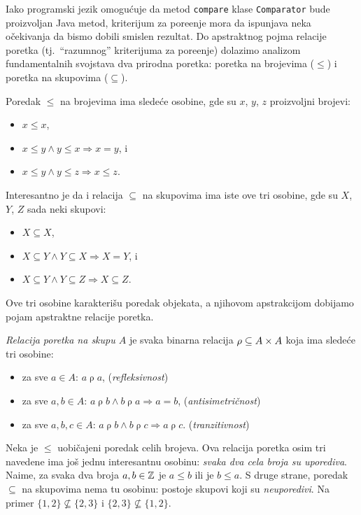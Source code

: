 Iako programski jezik omogu\'cuje da metod \texttt{compare} klase \texttt{Comparator} bude proizvoljan
Java metod, kriterijum za pore\dj enje mora da ispunjava neka o\v cekivanja da bismo dobili smislen rezultat.
Do apstraktnog pojma relacije poretka (tj.\ \enquote{razumnog} kriterijuma za pore\dj enje)
dolazimo analizom fundamentalnih svojstava dva prirodna poretka:
poretka na brojevima ($\le$) i poretka na skupovima ($\subseteq$).

Poredak $\le$ na brojevima ima slede\'ce osobine, gde su $x$, $y$, $z$ proizvoljni brojevi:
\begin{itemize}\itemsep -1.5pt
\item $x \le x$,
\item $x \le y \land y \le x \Rightarrow x = y$, i
\item $x \le y \land y \le z \Rightarrow x \le z$.
\end{itemize}
Interesantno je da i relacija $\subseteq$ na skupovima ima iste ove tri osobine, gde su $X$, $Y$, $Z$ sada neki skupovi:
\begin{itemize}\itemsep -1.5pt
\item $X \subseteq X$,
\item $X \subseteq Y \land Y \subseteq X \Rightarrow X = Y$, i
\item $X \subseteq Y \land Y \subseteq Z \Rightarrow X \subseteq Z$.
\end{itemize}
Ove tri osobine karakteri\v su poredak objekata, a njihovom
apstrakcijom dobijamo pojam apstraktne relacije poretka.

\begin{DEF}
  \emph{Relacija poretka na skupu $A$} je svaka binarna relacija $\mbox{$\rho$} \subseteq A \times A$
  koja ima slede\'ce tri osobine:
  \begin{itemize}\itemsep -1pt
  \item za sve $a \in A$: $a \mathrel{\rho} a$, \hfill (\emph{refleksivnost})
  \item za sve $a, b \in A$: $a \mathrel{\rho} b \land b \mathrel{\rho} a \Rightarrow a = b$, \hfill (\emph{antisimetri\v cnost})
  \item za sve $a, b, c \in A$: $a \mathrel{\rho} b \land b \mathrel{\rho} c \Rightarrow a \mathrel{\rho} c$. \hfill (\emph{tranzitivnost})
  \end{itemize}
\end{DEF}

Neka je $\le$ uobi\v cajeni poredak celih brojeva. Ova relacija poretka osim tri navedene ima jo\v s jednu
interesantnu osobinu: \emph{svaka dva cela broja su uporediva}.
Naime, za svaka dva broja $a, b \in \mathbb{Z}$ je $a \le b$ ili je $b \le a$.
S druge strane, poredak $\subseteq$ na skupovima nema tu osobinu: postoje skupovi koji su \emph{neuporedivi}.
Na primer $\{1, 2\} \not\subseteq \{2, 3\}$ i $\{2, 3\} \not\subseteq \{1, 2\}$.

